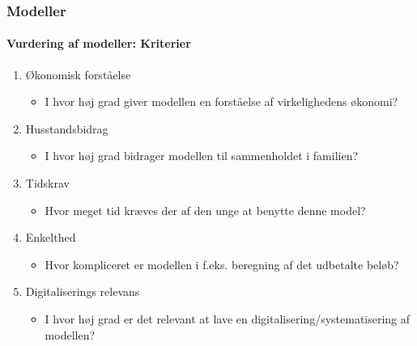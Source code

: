 \begin{frame}
\frametitle{Modeller}
\framesubtitle{\textbf{Vurdering af modeller:} Kriterier}
    \begin{enumerate}
        \item{Økonomisk forståelse}
            \begin{itemize}
                \item{I hvor høj grad giver modellen en forståelse af virkelighedens økonomi?}
            \end{itemize}
        
        \item{Husstandsbidrag}
            \begin{itemize}
                \item{I hvor høj grad bidrager modellen til sammenholdet i familien?}
            \end{itemize}
        
        \item{Tidskrav}
            \begin{itemize}
                \item{Hvor meget tid kræves der af den unge at benytte denne model?}
            \end{itemize}
        
        \item{Enkelthed}
            \begin{itemize}
                \item{Hvor kompliceret er modellen i f.eks. beregning af det udbetalte beløb?}
            \end{itemize}
        \item{Digitaliserings relevans}
            \begin{itemize}
                \item{I hvor høj grad er det relevant at lave en digitalisering/systematisering af modellen?}
            \end{itemize}
    \end{enumerate}    
\end{frame}

